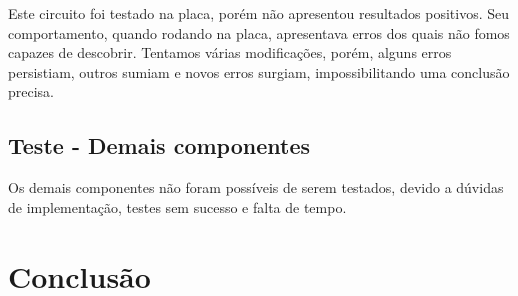 \documentclass[12pt,a4paper,openany]{abntex2}
\begin{document}
Este circuito foi testado na placa, porém não apresentou resultados positivos. Seu comportamento, quando rodando na placa, apresentava erros dos quais não fomos capazes de descobrir. Tentamos várias modificações, porém, alguns erros persistiam, outros sumiam e novos erros surgiam, impossibilitando uma conclusão precisa.

\section{Teste - Demais componentes}

Os demais componentes não foram possíveis de serem testados, devido a dúvidas de implementação, testes sem sucesso e falta de tempo.

\chapter{Conclusão}
\end{document}
